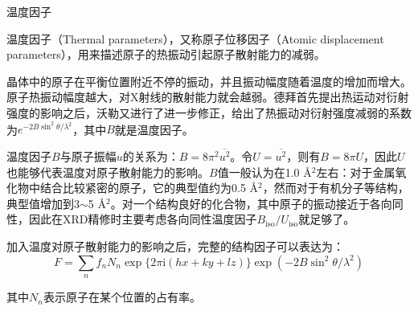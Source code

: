 \documentclass{article}
\begin{document}
\begin{section}{温度因子}

温度因子（Thermal parameters），又称原子位移因子（Atomic displacement parameters），用来描述原子的热振动引起原子散射能力的减弱。

晶体中的原子在平衡位置附近不停的振动，并且振动幅度随着温度的增加而增大。原子热振动幅度越大，对X射线的散射能力就会越弱。德拜首先提出热运动对衍射强度的影响之后，沃勒又进行了进一步修正，给出了热振动对衍射强度减弱的系数为$e^{-2B\sin^2\theta/\lambda^2}$，其中$B$就是温度因子。

温度因子$B$与原子振幅$u$的关系为：$B=8\pi^2\overline{u^2}$。令$U=\overline{u^2}$，则有$B=8\pi U$，因此$U$也能够代表温度对原子散射能力的影响。$B$值一般认为在1.0 \AA$^2$左右：对于金属氧化物中结合比较紧密的原子，它的典型值约为0.5 \AA$^2$，然而对于有机分子等结构，典型值增加到3$\sim$5 \AA$^2$。对一个结构良好的化合物，其中原子的振动接近于各向同性，因此在XRD精修时主要考虑各向同性温度因子$B_\text{iso}/U_\text{iso}$就足够了。

加入温度对原子散射能力的影响之后，完整的结构因子可以表达为：
\[F=\sum_n f_n N_n \exp\{2\pi \mathrm{i} (hx+ky+lz)\}\exp(-2B\sin^2\theta/\lambda^2)\]

其中$N_n$表示原子在某个位置的占有率。

\end{section}
\end{document}
